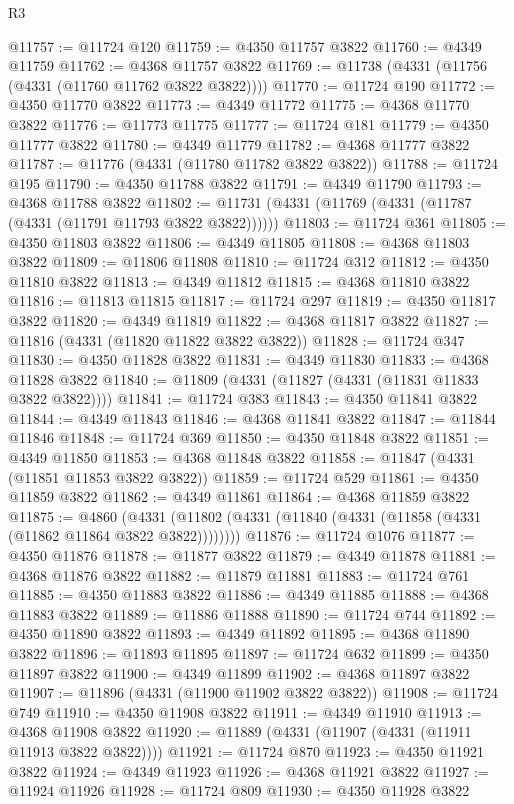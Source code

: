 \begin{lexlean}{R3}
\begin{coremodule}
@11757 := @11724 @120
@11759 := @4350 @11757 @3822
@11760 := @4349 @11759
@11762 := @4368 @11757 @3822
@11769 := @11738 (@4331 (@11756 (@4331 (@11760 @11762 @3822 @3822))))
@11770 := @11724 @190
@11772 := @4350 @11770 @3822
@11773 := @4349 @11772
@11775 := @4368 @11770 @3822
@11776 := @11773 @11775
@11777 := @11724 @181
@11779 := @4350 @11777 @3822
@11780 := @4349 @11779
@11782 := @4368 @11777 @3822
@11787 := @11776 (@4331 (@11780 @11782 @3822 @3822))
@11788 := @11724 @195
@11790 := @4350 @11788 @3822
@11791 := @4349 @11790
@11793 := @4368 @11788 @3822
@11802 := @11731 (@4331 (@11769 (@4331 (@11787 (@4331 (@11791 @11793 @3822 @3822))))))
@11803 := @11724 @361
@11805 := @4350 @11803 @3822
@11806 := @4349 @11805
@11808 := @4368 @11803 @3822
@11809 := @11806 @11808
@11810 := @11724 @312
@11812 := @4350 @11810 @3822
@11813 := @4349 @11812
@11815 := @4368 @11810 @3822
@11816 := @11813 @11815
@11817 := @11724 @297
@11819 := @4350 @11817 @3822
@11820 := @4349 @11819
@11822 := @4368 @11817 @3822
@11827 := @11816 (@4331 (@11820 @11822 @3822 @3822))
@11828 := @11724 @347
@11830 := @4350 @11828 @3822
@11831 := @4349 @11830
@11833 := @4368 @11828 @3822
@11840 := @11809 (@4331 (@11827 (@4331 (@11831 @11833 @3822 @3822))))
@11841 := @11724 @383
@11843 := @4350 @11841 @3822
@11844 := @4349 @11843
@11846 := @4368 @11841 @3822
@11847 := @11844 @11846
@11848 := @11724 @369
@11850 := @4350 @11848 @3822
@11851 := @4349 @11850
@11853 := @4368 @11848 @3822
@11858 := @11847 (@4331 (@11851 @11853 @3822 @3822))
@11859 := @11724 @529
@11861 := @4350 @11859 @3822
@11862 := @4349 @11861
@11864 := @4368 @11859 @3822
@11875 := @4860
    (@4331 (@11802 (@4331 (@11840 (@4331 (@11858 (@4331 (@11862 @11864 @3822 @3822))))))))
@11876 := @11724 @1076
@11877 := @4350 @11876
@11878 := @11877 @3822
@11879 := @4349 @11878
@11881 := @4368 @11876 @3822
@11882 := @11879 @11881
@11883 := @11724 @761
@11885 := @4350 @11883 @3822
@11886 := @4349 @11885
@11888 := @4368 @11883 @3822
@11889 := @11886 @11888
@11890 := @11724 @744
@11892 := @4350 @11890 @3822
@11893 := @4349 @11892
@11895 := @4368 @11890 @3822
@11896 := @11893 @11895
@11897 := @11724 @632
@11899 := @4350 @11897 @3822
@11900 := @4349 @11899
@11902 := @4368 @11897 @3822
@11907 := @11896 (@4331 (@11900 @11902 @3822 @3822))
@11908 := @11724 @749
@11910 := @4350 @11908 @3822
@11911 := @4349 @11910
@11913 := @4368 @11908 @3822
@11920 := @11889 (@4331 (@11907 (@4331 (@11911 @11913 @3822 @3822))))
@11921 := @11724 @870
@11923 := @4350 @11921 @3822
@11924 := @4349 @11923
@11926 := @4368 @11921 @3822
@11927 := @11924 @11926
@11928 := @11724 @809
@11930 := @4350 @11928 @3822

\end{coremodule}
\end{lexlean}
